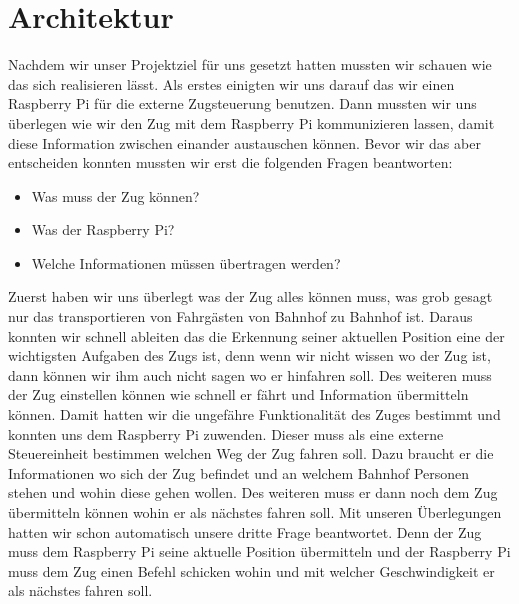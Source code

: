 \chapter{Architektur}
Nachdem wir unser Projektziel für uns gesetzt hatten mussten wir schauen wie das sich realisieren lässt. Als erstes einigten wir uns darauf das wir einen Raspberry Pi für die externe Zugsteuerung benutzen. Dann mussten wir uns überlegen wie wir den Zug mit dem Raspberry Pi kommunizieren lassen, damit diese Information zwischen einander austauschen können. Bevor wir das aber entscheiden konnten mussten wir erst die folgenden Fragen beantworten:
\begin{itemize}
\item Was muss der Zug können?
\item Was der Raspberry Pi?
\item Welche Informationen müssen übertragen werden? 
\end{itemize}
Zuerst haben wir uns überlegt was der Zug alles können muss, was grob gesagt nur das transportieren von Fahrgästen von Bahnhof zu Bahnhof ist. Daraus konnten wir schnell ableiten das die Erkennung seiner aktuellen Position eine der wichtigsten Aufgaben des Zugs ist, denn wenn wir nicht wissen wo der Zug ist, dann können wir ihm auch nicht sagen wo er hinfahren soll. Des weiteren muss der Zug einstellen können wie schnell er fährt und Information übermitteln können. Damit hatten wir die ungefähre Funktionalität des Zuges bestimmt und konnten uns dem Raspberry Pi zuwenden. Dieser muss als eine externe Steuereinheit bestimmen welchen Weg der Zug fahren soll. Dazu braucht er die Informationen wo sich der Zug befindet und an welchem Bahnhof Personen stehen und wohin diese gehen wollen. Des weiteren muss er dann noch dem Zug übermitteln können wohin er als nächstes fahren soll. Mit unseren Überlegungen hatten wir schon automatisch unsere dritte Frage beantwortet. Denn der Zug muss dem Raspberry Pi seine aktuelle Position übermitteln und der Raspberry Pi muss dem Zug einen Befehl schicken wohin und mit welcher Geschwindigkeit er als nächstes fahren soll. 

